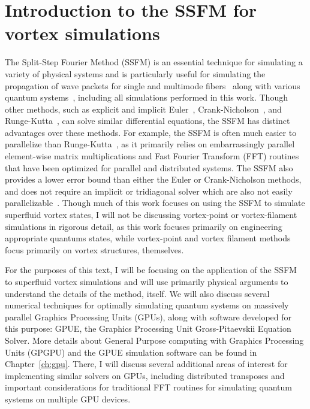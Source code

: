 \chapter{Introduction to the SSFM for vortex simulations}
\label{ch:splitop}
The Split-Step Fourier Method (SSFM) is an essential technique for simulating a variety of physical systems and is particularly useful for simulating the propagation of wave packets for single and multimode fibers~\cite{agrawal2000, sinkin2003, meirelles2005, min2003} along with various quantum systems~\cite{bayindir2015, weideman1986, wang2005}, including all simulations performed in this work.
Though other methods, such as explicit and implicit Euler~\cite{butcher2016}, Crank-Nicholson~\cite{crank1947}, and Runge-Kutta~\cite{butcher2016}, can solve similar differential equations, the SSFM has distinct advantages over these methods.
For example, the SSFM is often much easier to parallelize than Runge-Kutta~\cite{brehler2017}, as it primarily relies on embarrassingly parallel element-wise matrix multiplications and Fast Fourier Transform (FFT) routines that have been optimized for parallel and distributed systems.
The SSFM also provides a lower error bound than either the Euler or Crank-Nicholson methods, and does not require an implicit or tridiagonal solver \cite{conte2017, thomas1949} which are also not easily parallelizable~\cite{goddeke2010, wang1981, sweet1977}.
Though much of this work focuses on using the SSFM to simulate superfluid vortex states, I will not be discussing vortex-point or vortex-filament simulations in rigorous detail, as this work focuses primarily on engineering appropriate quantums states, while vortex-point and vortex filament methods focus primarily on vortex structures, themselves.

For the purposes of this text, I will be focusing on the application of the SSFM to superfluid vortex simulations and will use primarily physical arguments to understand the details of the method, itself.
We will also discuss several numerical techniques for optimally simulating quantum systems on massively parallel Graphics Processing Units (GPUs), along with software developed for this purpose: GPUE, the Graphics Processing Unit Gross-Pitaevskii Equation Solver.
More details about General Purpose computing with Graphics Processing Units (GPGPU) and the GPUE simulation software can be found in Chapter~\ref{ch:gpu}.
There, I will discuss several additional areas of interest for implementing similar solvers on GPUs, including distributed transposes and important considerations for traditional FFT routines for simulating quantum systems on multiple GPU devices.

